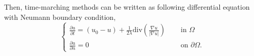 \documentclass[fontsize=12pt]{article}
\begin{document}
Then, time-marching methods can be written as following differential equation with Neumann boundary condition,
\begin{equation*}
\begin{cases}
\frac{\partial u}{\partial t} = (u_0 - u) + \frac{1}{2\lambda} \mathrm{div} \left( \frac{\nabla u}{|\nabla u|} \right)\quad& \text{ in } \Omega\\
\frac{\partial u}{\partial n} = 0 & \text{ on } \partial \Omega.
\end{cases}
\end{equation*}





\end{document}
